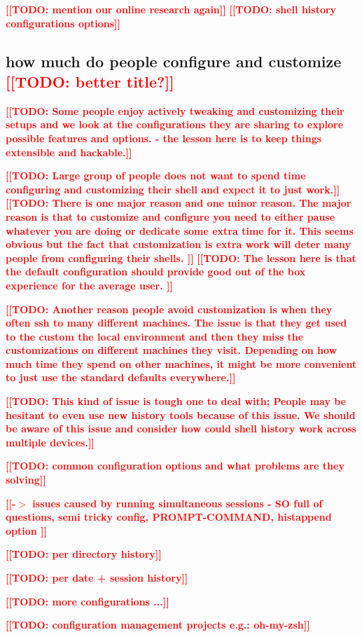 \documentclass[thesis=M,english]{FITthesis}[2012/10/20]
\newcommand{\todotext}[1]{\textcolor{red}{\textbf{[[#1]]}}}
\newcommand{\redtext}[1]{\textcolor{red}{[[#1]]}}
\begin{document}
\todotext{TODO: mention our online research again}
\todotext{TODO: shell history configurations options}


\subsection{how much do people configure and customize \redtext{TODO: better title?}} 
\todotext{TODO: Some people enjoy actively tweaking and customizing their setups and we look at the configurations they are sharing to explore possible features and options. - the lesson here is to keep things extensible and hackable.}

\todotext{TODO: Large group of people does not want to spend time configuring and customizing their shell and expect it to just work.}
\todotext{TODO: There is one major reason and one minor reason. The major reason is that to customize and configure you need to either pause whatever you are doing or dedicate some extra time for it. This seems obvious but the fact that customization is extra work will deter many people from configuring their shells. }
\todotext{TODO: The lesson here is that the default configuration should provide good out of the box experience for the average user. }

\todotext{TODO: Another reason people avoid customization is when they often ssh to many different machines. The issue is that they get used to the custom the local environment and then they miss the customizations on different machines they visit. Depending on how much time they spend on other machines, it might be more convenient to just use the standard defaults everywhere.}

\todotext{TODO: This kind of issue is tough one to deal with; People may be hesitant to even use new history tools because of this issue. We should be aware of this issue and consider how could shell history work across multiple devices.}

\todotext{TODO: common configuration options and what problems are they solving}

\todotext{-$>$ issues caused by running simultaneous sessions - SO full of questions, semi tricky config, PROMPT-COMMAND, histappend option }

\todotext{TODO: per directory history}

\todotext{TODO: per date + session history}

\todotext{TODO: more configurations ...}

\todotext{TODO: configuration management projects e.g.: oh-my-zsh}
\end{document}
